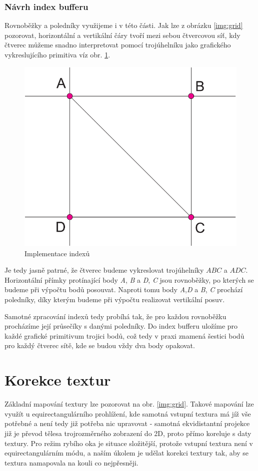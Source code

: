 \newpage

\subsubsection{Návrh index bufferu}
Rovnoběžky a poledníky využijeme i v této části. Jak lze z obrázku \ref{img:grid} pozorovat, horizontální a vertikální čáry tvoří mezi sebou čtvercovou síť, kdy čtverec můžeme snadno interpretovat pomocí trojúhelníku jako grafického vykreslujícího primitiva víz obr. \ref{img:indexes}.



\begin{figure}[h]
	\label{img:indexes}
	\centering
	\includegraphics[scale=1.0,angle=0,width=0.5\linewidth]{obrazky-figures/indexes}
	\caption{Implementace indexů}
\end{figure}

Je tedy jasně patrné, že čtverec budeme vykreslovat trojúhelníky $ABC$ a $ADC$. Horizontální přímky protínající body \textit{A}, \textit{B} a \textit{D}, \textit{C}   jsou rovnoběžky, po kterých se budeme při výpočtu bodů posouvat. Naproti tomu body \textit{A},\textit{D} a \textit{B}, \textit{C} prochází poledníky, díky kterým budeme při výpočtu realizovat vertikální posuv.

Samotné zpracování indexů tedy probíhá tak, že pro každou rovnoběžku procházíme její průsečíky s danými poledníky. Do index bufferu uložíme pro každé grafické primitivum trojici bodů, což tedy v praxi znamená šestici bodů pro každý čtverec sítě, kde se budou vždy dva body opakovat.

\newpage

\section{Korekce textur}
Základní mapování textury lze pozorovat na obr. \ref{img:grid}. Takové mapování lze využít u equirectangulárního prohlížení, kde samotná vstupní textura má jíž vše potřebné a není tedy již potřeba nic upravovat - samotná ekvidistantní projekce již je převod tělesa trojrozměrného zobrazení do 2D, proto přímo koreluje s daty textury. Pro režim rybího oka je situace složitější, protože vstupní textura není v equirectangulárním módu, a naším úkolem je udělat korekci textury tak, aby se textura namapovala na kouli co nejpřesněji.


